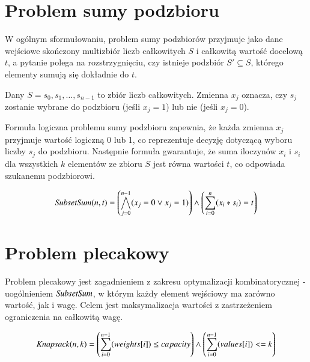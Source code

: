 \section{Problem sumy podzbioru}
W ogólnym sformułowaniu, problem sumy podzbiorów przyjmuje jako dane wejściowe
skończony multizbiór liczb całkowitych $S$ i całkowitą wartość docelową $t$,
a pytanie polega na rozstrzygnięciu, czy istnieje podzbiór $S' \subseteq S$,
którego elementy sumują się dokładnie do $t$.



Dany $S = {s_0, s_1, \ldots, s_{n-1}}$ to zbiór liczb całkowitych. Zmienna $x_j$ oznacza, czy $s_j$ zostanie wybrane do podzbioru (jeśli $x_j = 1$) lub nie (jeśli $x_j = 0$).

Formuła logiczna problemu sumy podzbioru zapewnia, że każda zmienna $x_j$ przyjmuje wartość logiczną 0 lub 1, co reprezentuje decyzję dotyczącą wyboru liczby $s_j$ do podzbioru. Następnie formuła gwarantuje, że suma iloczynów $x_i$ i $s_i$ dla wszystkich \(k\) elementów ze zbioru $S$ jest równa wartości $t$, co odpowiada szukanemu podzbiorowi.

\begin{align*}
	{\mathit{SubsetSum}}(n, t) = \left( \bigwedge_{j=0}^{n-1} (x_j = 0 \lor x_j = 1) \right) \land 
	\left( \sum_{i=0}^{n} (x_i * s_i) = t \right)
\end{align*}





\section{Problem plecakowy}
Problem plecakowy jest zagadnieniem z zakresu optymalizacji kombinatorycznej - uogólnieniem ${\mathit{SubsetSum}}$, w którym każdy element wejściowy ma zarówno wartość, jak i wagę. Celem jest maksymalizacja wartości z zastrzeżeniem ograniczenia na całkowitą wagę.

\begin{align*}
	{\mathit{Knapsack}}(n, k) = \left( \sum_{i=0}^{n-1} (weights[i]) \leq capacity \right) \land 
	\left( \sum_{i=0}^{n-1} (values[i]) <= k \right)
\end{align*}


